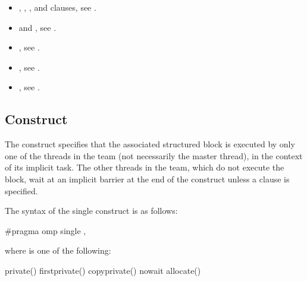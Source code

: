 \crossreferences
\begin{itemize}
\item {}, , , and  clauses, see
.

\item {} and , see
  .

\item {}, see .

\item {}, see
.

\item {}, see 
.

\end{itemize}










\subsection{ Construct}
\label{subsec:single Construct}
\summary
The  construct specifies that the associated structured block is executed by only
one of the threads in the team (not necessarily the master thread), in the context of its
implicit task. The other threads in the team, which do not execute the block, wait at an
implicit barrier at the end of the  construct unless a  clause is specified.

\syntax
\begin{ccppspecific}
The syntax of the single construct is as follows:

\begin{ompcPragma}
#pragma omp single \plc{[clause[ [},\plc{] clause] ... ] new-line}
\end{ompcPragma}

\begin{samepage}
where  is one of the following:

\begin{indentedcodelist}
private()
firstprivate()
copyprivate()
nowait
allocate(\plc{[allocator: ]})
\end{indentedcodelist}
\end{samepage}
\end{ccppspecific}

